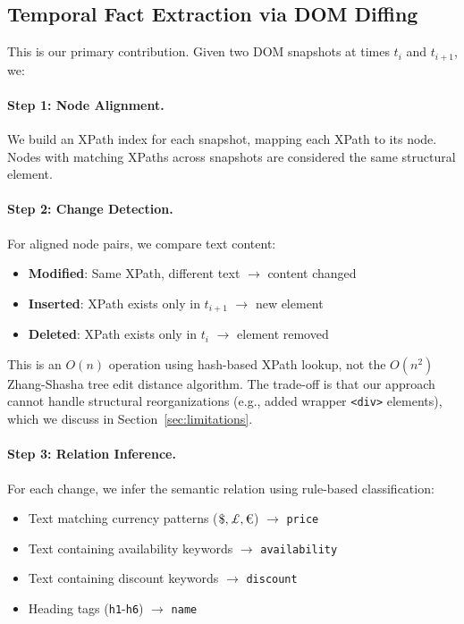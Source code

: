 \documentclass[11pt]{article}
\begin{document}
\subsection{Temporal Fact Extraction via DOM Diffing}
\label{sec:temporal}

This is our primary contribution. Given two DOM snapshots at times $t_i$ and $t_{i+1}$, we:

\paragraph{Step 1: Node Alignment.} We build an XPath index for each snapshot, mapping each XPath to its node. Nodes with matching XPaths across snapshots are considered the same structural element.

\paragraph{Step 2: Change Detection.} For aligned node pairs, we compare text content:
\begin{itemize}
    \item \textbf{Modified}: Same XPath, different text $\rightarrow$ content changed
    \item \textbf{Inserted}: XPath exists only in $t_{i+1}$ $\rightarrow$ new element
    \item \textbf{Deleted}: XPath exists only in $t_i$ $\rightarrow$ element removed
\end{itemize}

This is an $O(n)$ operation using hash-based XPath lookup, not the $O(n^2)$ Zhang-Shasha tree edit distance algorithm. The trade-off is that our approach cannot handle structural reorganizations (e.g., added wrapper \texttt{<div>} elements), which we discuss in Section~\ref{sec:limitations}.

\paragraph{Step 3: Relation Inference.} For each change, we infer the semantic relation using rule-based classification:
\begin{itemize}
    \item Text matching currency patterns ($\$, \pounds, \text{\texteuro}$) $\rightarrow$ \texttt{price}
    \item Text containing availability keywords $\rightarrow$ \texttt{availability}
    \item Text containing discount keywords $\rightarrow$ \texttt{discount}
    \item Heading tags (\texttt{h1}-\texttt{h6}) $\rightarrow$ \texttt{name}
\end{itemize}
\end{document}
